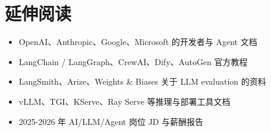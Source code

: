 \section{延伸阅读}

\begin{itemize}[leftmargin=2em]
\item OpenAI、Anthropic、Google、Microsoft 的开发者与 Agent 文档
\item LangChain / LangGraph、CrewAI、Dify、AutoGen 官方教程
\item LangSmith、Arize、Weights \& Biases 关于 LLM evaluation 的资料
\item vLLM、TGI、KServe、Ray Serve 等推理与部署工具文档
\item 2025-2026 年 AI/LLM/Agent 岗位 JD 与薪酬报告
\end{itemize}

